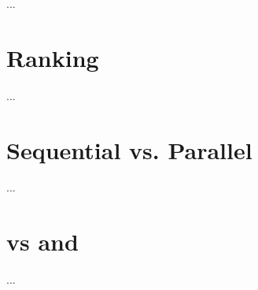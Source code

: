 

  ...
  
  \section{Ranking}
    ...
  \section{Sequential vs. Parallel}
    ...
  \section{\man vs \ndpn and \ndpv}
    ...
    
